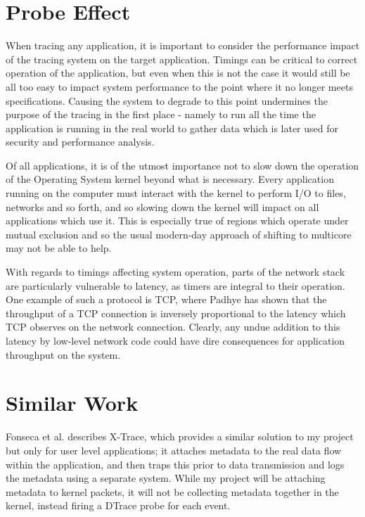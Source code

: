 \documentclass[a4paper,12pt,twoside,openright]{report}
\begin{document}
	\section{Probe Effect}	
	When tracing any application, it is important to consider the performance impact of the tracing system on the target application. Timings can be critical to correct operation of the application, but even when this is not the case it would still be all too easy to impact system performance to the point where it no longer meets specifications. Causing the system to degrade to this point undermines the purpose of the tracing in the first place - namely to run all the time the application is running in the real world to gather data which is later used for security and performance analysis.
	
	Of all applications, it is of the utmost importance not to slow down the operation of the Operating System kernel beyond what is necessary. Every application running on the computer must interact with the kernel to perform I/O to files, networks and so forth, and so slowing down the kernel will impact on all applications which use it. This is especially true of regions which operate under mutual exclusion and so the usual modern-day approach of shifting to multicore may not be able to help.
	
	With regards to timings affecting system operation, parts of the network stack are particularly vulnerable to latency, as timers are integral to their operation. One example of such a protocol is TCP, where Padhye\cite{Padhye-TCP} has shown that the throughput of a TCP connection is inversely proportional to the latency which TCP observes on the network connection. Clearly, any undue addition to this latency by low-level network code could have dire consequences for application throughput on the system.
	
	\section{Similar Work}
	
	Fonseca et al.\cite{X-Trace} describes X-Trace, which provides a similar solution to my project but only for user level applications; it attaches metadata to the real data flow within the application, and then traps this prior to data transmission and logs the metadata using a separate system. While my project will be attaching metadata to kernel packets, it will not be collecting metadata together in the kernel, instead firing a DTrace probe for each event.
	
\end{document}
